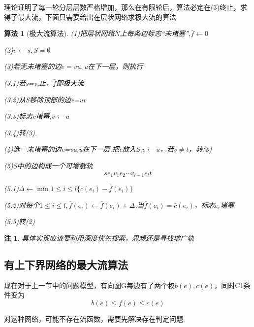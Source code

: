 \documentclass[UTF8]{ctexart}
\newtheorem*{note}{注}
\newtheorem{alg}{算法}
\begin{document}
理论证明了每一轮分层层数严格增加，那么在有限轮后，算法必定在(3)终止，求得了最大流，下面只需要给出在层状网络求极大流的算法
\begin{alg}[极大流算法]
\item (1)把层状网络$\bar{N}$上每条边标志“未堵塞”,$\bar{f}\leftarrow 0$
\item (2)$v\leftarrow s,S = \emptyset$
\item (3)若无未堵塞的边$e=vu,$u在下一层，则执行
\item (3.1)若s=v,止，$\bar{f}$即极大流
\item (3.2)从S移除顶部的边e=uv
\item (3.3)标志e堵塞,$v\leftarrow u$
\item (3.4)转(3).
\item (4)选一未堵塞的边e=vu,u在下一层,把e放入S,$v\leftarrow u$，若$v\neq t$，转(3)
\item (5)S中的边构成一个可增载轨$$se_1v_1e_2\cdots v_{l-1}e_lt$$
\item (5.1)$\Delta \leftarrow \min \limits{1\leq i \leq l}\{\bar{c}(e_i)-\bar{f}(e_i)\}$
\item (5.2)对每个$1\leq i \leq l,\bar{f}(e_i)\leftarrow \bar{f}(e_i)+\Delta$,当$\bar{f}(e_i)=\bar{c}(e_i)$，标志$e_i$堵塞
\item (5.3)转(2)
\end{alg}
\begin{note}
具体实现应该要利用深度优先搜索，思想还是寻找增广轨
\end{note}
\subsection{有上下界网络的最大流算法}
现在对于上一节中的问题模型，有向图G每边有了两个权$b(e),c(e)$，同时C1条件变为\[b(e)\leq f(e) \leq c(e)\]

对这种网络，可能不存在流函数，需要先解决存在判定问题.
\end{document}
